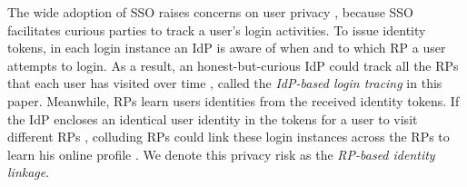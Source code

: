 The wide adoption of SSO raises concerns on user privacy \cite{NIST2017draft,SPRESSO,BrowserID,maler2008venn},
 because SSO facilitates curious parties to track a user's login activities.
To issue identity tokens,
in each login instance
 an IdP is aware of when and to which RP a user attempts to login.
As a result, an honest-but-curious IdP could track all the RPs that each user has visited over time \cite{BrowserID,SPRESSO},
 called the {\em IdP-based login tracing} in this paper.
Meanwhile, RPs learn users identities from the received identity tokens.
If the IdP encloses an identical user identity in the tokens for a user to visit different RPs \cite{maler2008venn,Google,FirefoxAccount},
     colluding RPs could link these login instances across the RPs %
      to learn his online profile \cite{maler2008venn}.
We denote this privacy risk as the {\em RP-based identity linkage}.


%

